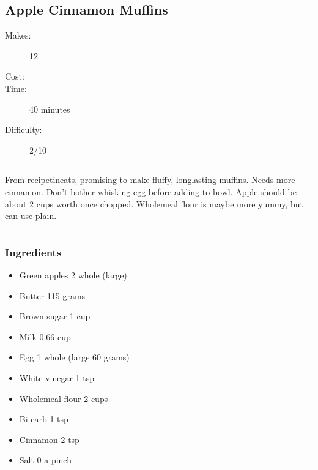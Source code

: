 \documentclass[]{article}
\begin{document}
\subsection*{\center\huge Apple Cinnamon Muffins}
\begin{description}
\item[Makes:] 12 
\item[Cost:] \textdollar
\item[Time:] 40 minutes
\item[Difficulty:] 2/10
\end{description}
\vspace{0.2cm}\hrule\vspace{0.5cm}
\begin{adjustwidth}{0.5 cm}{0.5 cm}

From \href{https://www.recipetineats.com/brown-sugar-apple-muffins/}{recipetineats}, promising to make fluffy, longlasting muffins. Needs more cinnamon. Don't bother whisking egg before adding to bowl. Apple should be about 2 cups worth once chopped. Wholemeal flour is maybe more yummy, but can use plain. \hfill{}\color{black}

\end{adjustwidth}
\vspace{0.5cm}\hrule
\subsubsection*{\Large Ingredients}
\begin{multicols}{2}
\begin{itemize}
 \item Green apples \hfill 2 whole (large)
 \item Butter \hfill 115 grams
 \item Brown sugar \hfill 1 cup
 \item Milk \hfill 0.66 cup
 \item Egg \hfill 1 whole (large 60 grams)
 \item White vinegar \hfill 1 tsp
 \item Wholemeal flour \hfill 2 cups
 \item Bi-carb \hfill 1 tsp
 \item Cinnamon \hfill 2 tsp
 \item Salt \hfill 0 a pinch
\end{itemize}
\end{multicols}
\end{document}
